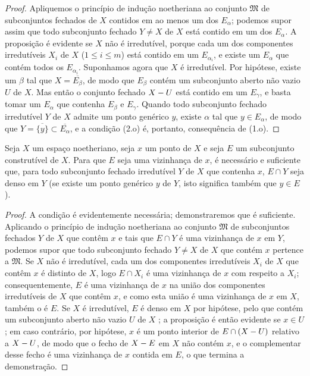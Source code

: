 \begin{proof}
Apliquemos o princípio de indução noetheriana  ao conjunto $\mathfrak{M}$ de subconjuntos fechados de $X$ contidos em ao menos um dos $E_\alpha$; podemos supor assim que todo subconjunto fechado $Y\neq X$ de $X$ está contido em um dos $E_\alpha$.
A proposição é evidente se $X$ não é irredutível, porque cada um dos componentes irredutíveis $X_i$ de $X$ ($1\leq i\leq m$) está contido em um $E_{\alpha_i}$, e existe um $E_\alpha$ que contém todos os $E_{\alpha_i}$.
Suponhamos agora que $X$ é irredutível.
Por hipótese, existe um $\beta$ tal que $X=\overline{E_\beta}$, de modo que  $E_\beta$ contém um subconjunto aberto não vazio $U$ de $X$.
Mas então o conjunto fechado $X- U$ está contido em um $E_\gamma$, e basta tomar um $E_\alpha$ que contenha $E_\beta$ e $E_\gamma$.
Quando todo subconjunto fechado irredutível $Y$ de $X$
admite um ponto genérico $y$, existe $\alpha$ tal que $y\in E_\alpha$, de modo que $Y=\overline{\{y\}}\subset\overline{E_\alpha}$, e a condição (2.o) é, portanto, consequência de (1.o).
\end{proof}

\begin{proposition}[9.2.5]
\label{0.9.2.5}
Seja $X$ um espaço noetheriano, seja $x$ um ponto de $X$ e seja $E$ um subconjunto construtível de $X$.
Para que $E$ seja uma vizinhança de $x$, é necessário e suficiente que, para todo subconjunto fechado irredutível $Y$ de $X$ que contenha $x$, $E\cap Y$ seja denso em $Y$ (se existe um ponto genérico $y$ de $Y$, isto significa também  que $y\in E$).
\end{proposition}

\begin{proof}
A condição é evidentemente necessária; demonstraremos que é suficiente.
Aplicando o princípio de indução noetheriana ao conjunto $\mathfrak{M}$ de subconjuntos fechados $Y$ de $X$ que contêm $x$ e tais que $E\cap Y$ é uma vizinhança de $x$ em $Y$, podemos supor que todo subconjunto fechado $Y\neq X$ de $X$ que contém $x$ pertence a $\mathfrak{M}$.
Se $X$ não é irredutível, cada um dos componentes irredutíveis $X_i$ de $X$ que contêm $x$ é distinto de $X$, logo $E\cap X_i$ é uma vizinhança de $x$ com respeito a $X_i$; consequentemente, $E$ é uma vizinhança de $x$ na união dos componentes irredutíveis de $X$ que contêm $x$, e como esta união é uma vizinhança de $x$ em $X$, também o é $E$.
Se $X$ é irredutível, $E$ é denso em $X$ por hipótese, pelo que contém um subconjunto aberto não vazio $U$ de $X$ ; a proposição é então evidente se $x\in U$; em caso contrário, por hipótese, $x$ é um ponto interior de $E\cap(X- U)$ relativo a $X- U$, de modo que o fecho de $X- E$ em $X$ não contém $x$, e o complementar desse fecho é uma vizinhança de $x$ contida em $E$, o que termina a demonstração.
\end{proof}

